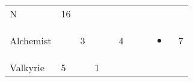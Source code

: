 \documentclass[12pt]{article}
\begin{document}
\begin{longtable}[]{@{}llllllllll@{}}
\begin{minipage}[t]{0.07\columnwidth}
N
\strut\end{minipage} &
\begin{minipage}[t]{0.08\columnwidth}\raggedright\strut
16
\strut\end{minipage}\tabularnewline
\begin{minipage}[t]{0.13\columnwidth}\raggedright\strut
Alchemist
\strut\end{minipage} &
\begin{minipage}[t]{0.06\columnwidth}\raggedright\strut
\strut\end{minipage} &
\begin{minipage}[t]{0.06\columnwidth}\raggedright\strut
3
\strut\end{minipage} &
\begin{minipage}[t]{0.06\columnwidth}\raggedright\strut
\strut\end{minipage} &
\begin{minipage}[t]{0.06\columnwidth}\raggedright\strut
\strut\end{minipage} &
\begin{minipage}[t]{0.06\columnwidth}\raggedright\strut
4
\strut\end{minipage} &
\begin{minipage}[t]{0.06\columnwidth}\raggedright\strut
\strut\end{minipage} &
\begin{minipage}[t]{0.06\columnwidth}\raggedright\strut
\strut\end{minipage} &
\begin{minipage}[t]{0.07\columnwidth}\raggedright\strut
\begin{itemize}
\item
\end{itemize}
\strut\end{minipage} &
\begin{minipage}[t]{0.08\columnwidth}\raggedright\strut
7
\strut\end{minipage}\tabularnewline
\begin{minipage}[t]{0.13\columnwidth}\raggedright\strut
Valkyrie
\strut\end{minipage} &
\begin{minipage}[t]{0.06\columnwidth}\raggedright\strut
5
\strut\end{minipage} &
\begin{minipage}[t]{0.06\columnwidth}\raggedright\strut
\strut\end{minipage} &
\begin{minipage}[t]{0.06\columnwidth}\raggedright\strut
1

\end{minipage}
\end{longtable}
\end{document}
